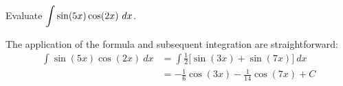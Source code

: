 \begin{example} \label{eg:5.2.6} %
Evaluate $\displaystyle\int\sin(5x)\cos(2x)\ dx$.

\solution The application of the formula and subsequent integration are straightforward:
\begin{align*}
\int\sin(5x)\cos(2x)\ dx &= \int \frac12\Big[\sin(3x)+\sin(7x)\Big]\ dx \\
&= -\frac16\cos(3x) - \frac1{14}\cos(7x) + C
\end{align*}
\end{example}